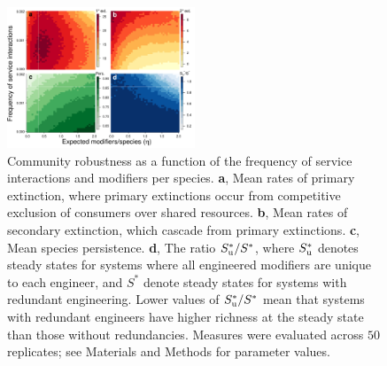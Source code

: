 \documentclass[twocolumn,preprintnumbers,amsmath,amssymb,superscriptaddress,linenumbers]{revtex4-1}
\begin{document}
\vspace{0mm}
\begin{figure}[h!]
\centering
\includegraphics[width=0.5\textwidth]{fig_engineers4.pdf}
\vspace{-8mm}
\caption{
Community robustness as a function of the frequency of service interactions and modifiers per species.
\textbf{a}, Mean rates of primary extinction, where primary extinctions occur from competitive exclusion of consumers over shared resources.
\textbf{b}, Mean rates of secondary extinction, which cascade from primary extinctions.
\textbf{c}, Mean species persistence.
\textbf{d}, The ratio $S^*_{\rm u}/S^*$, where $S^*_{\rm u}$ denotes steady states for systems where all engineered modifiers are unique to each engineer, and $S^*$ denote steady states for systems with redundant engineering. Lower values of $S^*_{\rm u}/S^*$ mean that systems with redundant engineers have higher richness at the steady state than those without redundancies.
Measures were evaluated across $50$ replicates; see Materials and Methods for parameter values.
\vspace{0mm}
}
\label{fig:engineers}
\end{figure}
\end{document}
